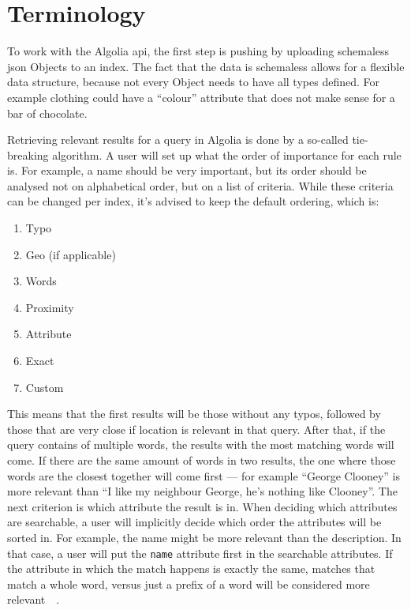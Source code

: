 
\section{Terminology}
\label{sec:terminology}

To work with the Algolia \acrshort{api}, the first step is pushing by uploading schemaless \acrshort{json} Objects to an \gls{index}. The fact that the data is schemaless allows for a flexible data structure, because not every Object needs to have all types defined. For example clothing could have a ``colour'' attribute that does not make sense for a bar of chocolate.

Retrieving relevant results for a query in Algolia is done by a so-called tie-breaking algorithm. A user will set up what the order of importance for each rule is. For example, a name should be very important, but its order should be analysed not on alphabetical order, but on a list of criteria. While these criteria can be changed per \gls{index}, it's advised to keep the default ordering, which is:

\begin{enumerate}
  \item Typo
  \item Geo (if applicable)
  \item Words
  \item Proximity
  \item Attribute
  \item Exact
  \item Custom
\end{enumerate}

This means that the first results will be those without any typos, followed by those that are very close if location is relevant in that query. After that, if the query contains of multiple words, the results with the most matching words will come. If there are the same amount of words in two results, the one where those words are the closest together will come first --- for example ``George Clooney'' is more relevant than ``I like my neighbour George, he's nothing like Clooney''. The next criterion is which attribute the result is in. When deciding which attributes are searchable, a user will implicitly decide which order the attributes will be sorted in. For example, the name might be more relevant than the description. In that case, a user will put the {\tt name} attribute first in the searchable attributes. If the attribute in which the match happens is exactly the same, matches that match a whole word, versus just a prefix of a word will be considered more relevant~\cite{algolia-relevance}~.

